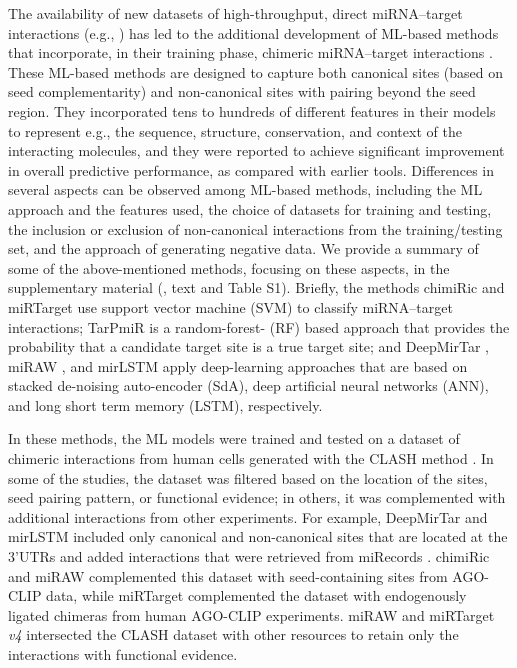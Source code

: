 \documentclass{bmcart}
\begin{document}
The availability of new datasets of high-throughput, direct miRNA--target interactions (e.g., \cite{scheel2017global, grosswendt2014unambiguous, darnell_moore2015mirna, helwak2013mapping}) has led to the additional development of ML-based methods that incorporate, in their training phase, chimeric miRNA--target interactions \cite{lu2016learning, ding2016tarpmir, pla2018miraw, wen2018deepmirtar, paker2019mirlstm,wang2016improving,liu2019prediction}. These ML-based methods are designed to capture both canonical sites (based on seed complementarity) and non-canonical sites with pairing beyond the seed region. They incorporated tens to hundreds of different features in their models to represent e.g., the sequence, structure, conservation, and context of the interacting molecules, and they were reported to achieve significant improvement in overall predictive performance, as compared with earlier tools. Differences in several aspects can be observed among ML-based methods, including the ML approach and the features used, the choice of datasets for training and testing, the inclusion or exclusion of non-canonical interactions from the training/testing set, and the approach of generating negative data. We provide a summary of some of the above-mentioned methods, focusing on these aspects, in the supplementary material (, text and Table S1). 
Briefly, the methods chimiRic \cite{lu2016learning} and miRTarget \cite{wang2016improving,liu2019prediction} use support vector machine (SVM) to classify miRNA--target interactions; TarPmiR \cite{ding2016tarpmir} is a random-forest- (RF) based approach that provides the probability that a candidate target site is a true target site; and DeepMirTar \cite{wen2018deepmirtar}, miRAW \cite{pla2018miraw}, and mirLSTM \cite{paker2019mirlstm} apply deep-learning approaches that are based on stacked de-noising auto-encoder (SdA), deep artificial neural networks (ANN), and long short term memory (LSTM), respectively.  

In these methods, the ML models were trained and tested on a dataset of chimeric interactions from human cells generated with the CLASH method \cite{helwak2013mapping}. In some of the studies, the dataset was filtered based on the location of the sites, seed pairing pattern, or functional evidence; in others, it was complemented with additional interactions from other experiments. For example, DeepMirTar \cite{wen2018deepmirtar} and mirLSTM \cite{paker2019mirlstm} included only canonical and non-canonical sites that are located at the 3'UTRs and added interactions that were retrieved from miRecords \cite{xiao2009mirecords}. 
chimiRic \cite{lu2016learning} and miRAW \cite{pla2018miraw} complemented this dataset with seed-containing sites from AGO-CLIP data, while miRTarget \cite{wang2016improving} complemented the dataset with endogenously ligated chimeras from human AGO-CLIP experiments. miRAW \cite{pla2018miraw} and miRTarget \textit{v4} \cite{liu2019prediction} intersected the CLASH dataset with other resources to retain only the interactions with functional evidence.
\end{document}
